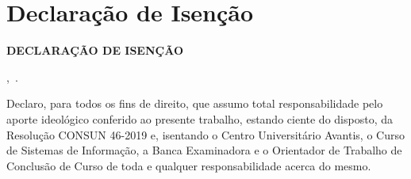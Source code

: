 \chapter{Declaração de Isenção}\label{anexo:a}

\begin{center}
    \textbf{DECLARAÇÃO DE ISENÇÃO}
\end{center}

\vspace{1cm}

\imprimirlocal,~\imprimirdata.

\vspace{1cm}

Declaro, para todos os fins de direito, que assumo total responsabilidade pelo aporte ideológico conferido ao presente trabalho, estando ciente do disposto, da Resolução CONSUN 46-2019 e, isentando o Centro Universitário Avantis, o Curso de Sistemas de Informação, a Banca Examinadora e o Orientador de Trabalho de Conclusão de Curso de toda e qualquer responsabilidade acerca do mesmo.\\
\vspace{5cm}
\begin{center}

\assinatura{\MakeTextUppercase{\textbf{\imprimirautor}}}
\end{center}

